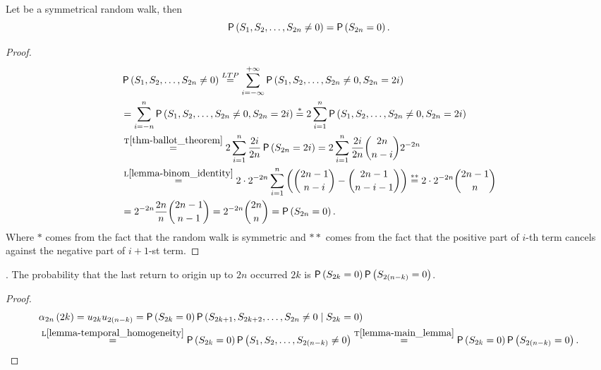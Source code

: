 \begin{lemma}\label{lemma-main_lemma}
 Let \rw be a symmetrical random walk, then
 \[
   \operatorname{\mathsf{P}} \left( S_1, S_2, \ldots, S_{2n}\neq 0 \right) =\operatorname{\mathsf{P}} \left( S_{2n}=0 \right).
  \]
\end{lemma}
\begin{proof}
  \[
  \begin{split}
    & \pr \left(S_1, S_2, \ldots, S_{2n}\neq 0 \right)
    \ltp \suma[i][-\infty][\pinf] \pr \left( S_1 , S_2, \ldots, S_{2n}\neq 0, S_{2n}=2i \right)\\
    & =\suma[i][-n][n] \pr \left( S_1 , S_2, \ldots, S_{2n}\neq 0, S_{2n}=2i \right)
    \overset{*}{=}2\suma \pr \left( S_1 , S_2, \ldots, S_{2n}\neq 0, S_{2n}=2i \right)\\
    & \overset{\text{T}\ref{thm-ballot_theorem}}{=}2\suma \frac{2i}{2n}\pr \left( S_{2n}=2i \right) =2\suma \frac{2i}{2n}\binom{2n}{n-i}2^{-2n}\\
    & \overset{\text{L}\ref{lemma-binom_identity}}{=} 2\cdot 2^{-2n}\suma \left( \binom{2n-1}{n-i}-\binom{2n-1}{n-i-1} \right) \overset{**}{=}2\cdot 2^{-2n}\binom{2n-1}{n}\\
    &=2^{-2n}\frac{2n}{n}\binom{2n-1}{n-1}
  =2^{-2n}\binom{2n}{n}=\pr \left( S_{2n}=0 \right).
  \end{split}
  \]
  Where $*$ comes from the fact that the random walk is symmetric and $**$ comes from the fact that the positive part of $i$-th term cancels against the negative part of $i+1$-st term.
\end{proof}
\begin{thm}\label{thm-return_origin_upto_time}
 \Lrws. The probability that the last return to origin up to \Time $2n$ occurred \intime $2k$
 is $\operatorname{\mathsf{P}} \left( S_{2k}=0 \right) \operatorname{\mathsf{P}} \left( S_{2 \left( n-k \right) }=0 \right) $.
\end{thm}
\begin{proof}
 \[
  \begin{split}
     & \alpha_{2n} \left( 2k \right) =u_{2k}u_{2 \left( n-k \right) }
     =\operatorname{\mathsf{P}} \left( S_{2k}=0 \right) \operatorname{\mathsf{P}} \left( S_{2k+1}, S_{2k+2}, \ldots, S_{2n}\neq 0 \mid S_{2k}=0 \right)\\
     & \overset{\text{L}\ref{lemma-temporal_homogeneity}}{=}\operatorname{\mathsf{P}} \left( S_{2k}=0 \right) \operatorname{\mathsf{P}} \left( S_{1}, S_{2}, \ldots, S_{2 \left( n-k \right) }\neq 0 \right)
     \overset{\text{T}\ref{lemma-main_lemma}}{=}\operatorname{\mathsf{P}} \left( S_{2k}=0 \right) \operatorname{\mathsf{P}} \left( S_{2 \left( n-k \right) }=0 \right).
  \end{split}
 \]
\end{proof}
